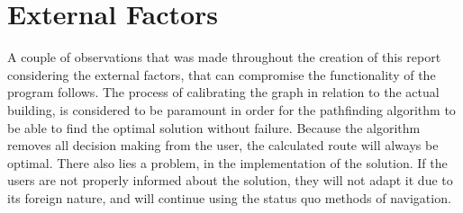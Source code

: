 \section{External Factors}

A couple of observations that was made throughout the creation of this report considering the external factors, that can compromise the functionality of the program follows. The process of calibrating the graph in relation to the actual building, is considered to be paramount in order for the pathfinding algorithm to be able to find the optimal solution without failure. Because the algorithm removes all decision making from the user, the calculated route will always be optimal. There also lies a problem, in the implementation of the solution. If the users are not properly informed about the solution, they will not adapt it due to its foreign nature, and will continue using the status quo methods of navigation.